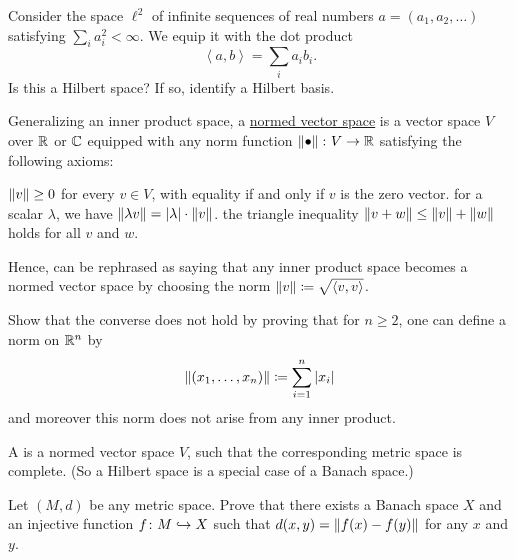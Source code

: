 \begin{problem}
	Consider the space $\ell^2$ of infinite sequences of real numbers
	$a = (a_1, a_2, \dots)$ satisfying $\sum_i a_i^2 < \infty$.
	We equip it with the dot product
	\[ \left< a, b\right> = \sum_i a_i b_i. \]
	Is this a Hilbert space?
	If so, identify a Hilbert basis.
\end{problem}

\begin{problem}
	Generalizing an inner product space,
	a \href{https://w.wiki/7ZHe}{normed vector space}
	is a vector space $V$ over $\mathbb R$ or $\mathbb C$
	equipped with any norm function $\left\lVert \bullet \right\rVert \colon V \to \mathbb R$
	satisfying the following axioms:
	\begin{itemize}
		\ii $\left\lVert v \right\rVert \ge 0$ for every $v \in V$, with equality if and only if $v$ is the zero vector.
		\ii for a scalar $\lambda$, we have $\left\lVert \lambda v \right\rVert = |\lambda| \cdot \left\lVert v \right\rVert$.
		\ii the triangle inequality $\left\lVert v+w \right\rVert \le \left\lVert v \right\rVert + \left\lVert w \right\rVert$ holds for all $v$ and $w$.
	\end{itemize}
	Hence, 
	can be rephrased as saying
	that any inner product space becomes a normed vector space
	by choosing the norm $\left\lVert v \right\rVert \coloneq \sqrt{\left\langle v, v \right\rangle}$.

	Show that the converse does not hold by proving that for $n \ge 2$,
	one can define a norm on $\mathbb R^n$ by
	\[ \left\lVert (x_1, \dots, x_n) \right\rVert \coloneqq \sum_{i=1}^n |x_i| \]
	and moreover this norm does not arise from any inner product.
\end{problem}

\begin{problem}
	A  is a normed vector space $V$,
	such that the corresponding metric space is complete.
	(So a Hilbert space is a special case of a Banach space.)

	Let $(M,d)$ be any metric space.
	Prove that there exists a Banach space $X$
	and an injective function $f \colon M \hookrightarrow X$
	such that $d(x,y) = \left\lVert f(x)-f(y) \right\rVert$ for any $x$ and $y$.
\end{problem}
